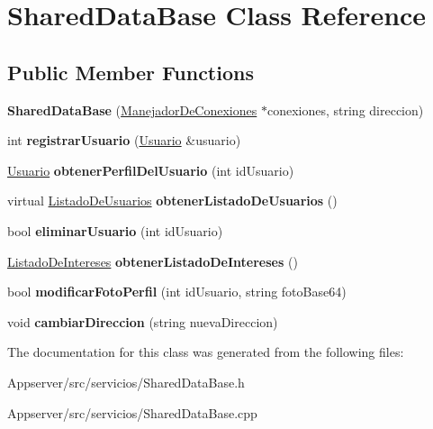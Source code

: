 \hypertarget{classSharedDataBase}{}\section{Shared\+Data\+Base Class Reference}
\label{classSharedDataBase}
\subsection*{Public Member Functions}
\begin{DoxyCompactItemize}
\item 
{\bfseries Shared\+Data\+Base} (\hyperlink{classManejadorDeConexiones}{Manejador\+De\+Conexiones} $\ast$conexiones, string direccion)\hypertarget{classSharedDataBase_a88120b37d96f817fdb98f253263ae82d}{}\label{classSharedDataBase_a88120b37d96f817fdb98f253263ae82d}

\item 
int {\bfseries registrar\+Usuario} (\hyperlink{classUsuario}{Usuario} \&usuario)\hypertarget{classSharedDataBase_a21b1b24a05e8688920fbca7b73db29a9}{}\label{classSharedDataBase_a21b1b24a05e8688920fbca7b73db29a9}

\item 
\hyperlink{classUsuario}{Usuario} {\bfseries obtener\+Perfil\+Del\+Usuario} (int id\+Usuario)\hypertarget{classSharedDataBase_aed6ca98c3f4611669c954a5349d87a7a}{}\label{classSharedDataBase_aed6ca98c3f4611669c954a5349d87a7a}

\item 
virtual \hyperlink{classListadoDeUsuarios}{Listado\+De\+Usuarios} {\bfseries obtener\+Listado\+De\+Usuarios} ()\hypertarget{classSharedDataBase_ae69c0bcf0c9c0b919108a6ffdf4591c8}{}\label{classSharedDataBase_ae69c0bcf0c9c0b919108a6ffdf4591c8}

\item 
bool {\bfseries eliminar\+Usuario} (int id\+Usuario)\hypertarget{classSharedDataBase_a5b49180f24cc1207b9377071de629464}{}\label{classSharedDataBase_a5b49180f24cc1207b9377071de629464}

\item 
\hyperlink{classListadoDeIntereses}{Listado\+De\+Intereses} {\bfseries obtener\+Listado\+De\+Intereses} ()\hypertarget{classSharedDataBase_a10d3cffe99db34f8aec5b9deb3ae75aa}{}\label{classSharedDataBase_a10d3cffe99db34f8aec5b9deb3ae75aa}

\item 
bool {\bfseries modificar\+Foto\+Perfil} (int id\+Usuario, string foto\+Base64)\hypertarget{classSharedDataBase_a41db25712bbc219d3d0fdcd97f37b890}{}\label{classSharedDataBase_a41db25712bbc219d3d0fdcd97f37b890}

\item 
void {\bfseries cambiar\+Direccion} (string nueva\+Direccion)\hypertarget{classSharedDataBase_ab97922b7ccd9e5977e253929c4a25346}{}\label{classSharedDataBase_ab97922b7ccd9e5977e253929c4a25346}

\end{DoxyCompactItemize}


The documentation for this class was generated from the following files\+:\begin{DoxyCompactItemize}
\item 
Appserver/src/servicios/Shared\+Data\+Base.\+h\item 
Appserver/src/servicios/Shared\+Data\+Base.\+cpp\end{DoxyCompactItemize}
